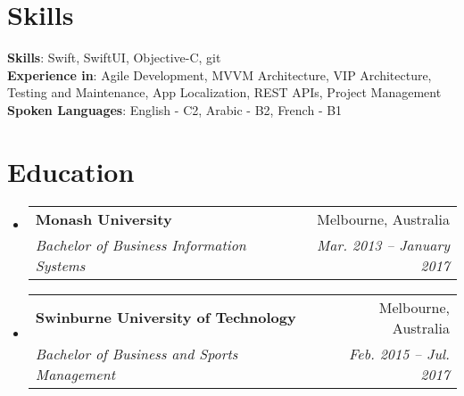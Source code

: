 \documentclass[letterpaper,11pt]{article}
\makeatletter
\newcommand{\resumeSubheading}[4]{
  \vspace{-2pt}\item
    \begin{tabular*}{0.97\textwidth}[t]{l@{\extracolsep{\fill}}r}
      \textbf{#1} & #2 \\
      \textit{\small#3} & \textit{\small #4} \\
    \end{tabular*}\vspace{-7pt}
}
\newcommand{\resumeSubHeadingListStart}{\begin{itemize}[leftmargin=0.15in, label={}]}
\newcommand{\resumeSubHeadingListEnd}{\end{itemize}}
\makeatother
\begin{document}
%
\section{Skills}
 \begin{itemize}[leftmargin=0.15in, label={}]
    \small{\item{
     \textbf{Skills}{: Swift, SwiftUI, Objective-C, git} \\
     \textbf{Experience in}{: Agile Development, MVVM Architecture, VIP Architecture, Testing and Maintenance, App Localization, REST APIs, Project Management } \\
     \textbf{Spoken Languages}{: English - C2, Arabic - B2, French - B1} \\
    }}
 \end{itemize}

\section{Education}
\resumeSubHeadingListStart
  \resumeSubheading
    {Monash University}{Melbourne, Australia}
    {Bachelor of Business Information Systems}{Mar. 2013 -- January 2017}
  \resumeSubheading
    {Swinburne University of Technology}{Melbourne, Australia}
    {Bachelor of Business and Sports Management}{Feb. 2015 -- Jul. 2017}
\resumeSubHeadingListEnd

\end{document}
